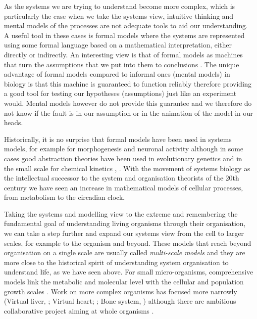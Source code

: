 As the systems we are trying to understand become more complex, which is
particularly the case when we take the systems view, intuitive thinking and
mental models of the processes are not adequate tools to aid our
understanding. A useful tool in these cases is formal models where the systems
are represented using some formal language based on a mathematical
interpretation, either directly or indirectly. An interesting view is that of
formal models as machines that turn the assumptions that we put into them to
conclusions \citep{gunawardena_models_2014}. The unique advantage of formal
models compared to informal ones (mental models) in biology is that this machine
is guaranteed to function reliably therefore providing a good tool for testing our
hypotheses (assumptions) just like an experiment would. Mental models however do
not provide this guarantee and we therefore do not know if the fault is in our
assumption or in the animation of the model in our heads.

Historically, it is no surprise that formal models have been used in systems
models, for example for morphogenesis \citep{turing_chemical_1952} and neuronal
activity \citep{hodgkin_quantitative_1952} although in some cases good
abstraction theories have been used in evolutionary genetics \citep[by
abstracting away the organism;][]{dobzhansky1964genetics} and in the small scale
for chemical kinetics \citep{michaelis1913kinetics, gunawardena_lessons_2012},
\citep[see also;][]{gunawardena2013biology}. With the movement of systems
biology as the intellectual successor to the system and organisation theorists
of the 20th century we have seen an increase in mathematical models of cellular
processes, from metabolism to the circadian clock.

Taking the systems and modelling view to the extreme and remembering the
fundamental goal of understanding living organisms through their organisation,
we can take a step further and expand our systems view from the cell to larger
scales, for example to the organism and beyond. These models that reach beyond
organisation on a single scale are usually called \emph{multi-scale models} and
they are more close to the historical spirit of understanding system
organisation to understand life, as we have seen above. For small
micro-organisms, comprehensive models link the metabolic and molecular level
with the cellular \citep{karr_whole-cell_2012} and population growth scales
\citep{weise_mechanistic_2015}. Work on more complex organisms has focused more
narrowly (Virtual liver, \citet{holzhutter2012virtual}; Virtual heart;
\citet{noble_modeling_2002}; Bone system, \citet{paoletti_multilevel_2012})
although there are ambitious collaborative project aiming at whole organisms
\citep[virtual rat, virtual human][]{beard_multiscale_2012, kohl_systems_2009}.

